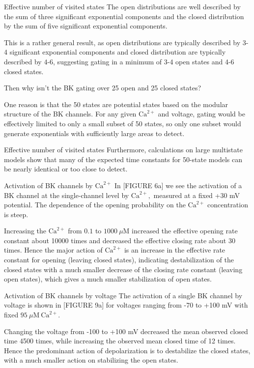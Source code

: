 \documentclass{beamer}
\newcommand{\ca}{\text{Ca}^{2+}}
\begin{document}
\begin{frame}{Effective number of visited states}
The open distributions are well described by the sum of three significant exponential components and the closed distribution by the sum of five significant exponential components.

This is a rather general result, as open distributions are typically described by 3-4 significant exponential components and closed distribution are typically described by 4-6, suggesting gating in a minimum of 3-4 open states and 4-6 closed states.

Then why isn't the BK gating over 25 open and 25 closed states?

One reason is that the 50 states are potential states based on the modular structure of the BK channels. 
For any given $\ca$ and voltage, gating would be effectively limited to only a small subset of 50 states, so only one subset would generate exponentials with sufficiently large areas to detect.

\end{frame}

\begin{frame}{Effective number of visited states}
Furthermore, calculations on large multistate models show that many of the expected time constants for 50-state models can be nearly identical or too close to detect.
\end{frame}

\begin{frame}{Activation of BK channels by $\ca$}
In [FIGURE 6a] we see the activation of a BK channel at the single-channel level by $\ca,$ measured at a fixed +30 mV potential.
The dependence of the opening probability on the $\ca$ concentration is steep.

Increasing the $\ca$ from $0.1$ to $1000\ \mu\text{M}$ increased the effective opening rate constant about 10000 times and decreased the effective closing rate about 30 times.
Hence the major action of $\ca$ is an increase in the effective rate constant for opening (leaving closed states), indicating destabilization of the closed states with a much smaller decrease of the closing rate constant (leaving open states), which gives a much smaller stabilization of open states. 

\end{frame}

\begin{frame}{Activation of BK channels by voltage}
The activation of a single BK channel by voltage is shown in [FIGURE 9a] for voltages ranging from -70 to +100 mV with fixed $95 \ \mu\text{M}\ \ca.$ 

Changing the voltage from -100 to +100 mV decreased the mean observed closed time 4500 times, while increasing the observed mean closed time of 12 times.
Hence the predominant action of depolarization is to destabilize the closed states, with a much smaller action on stabilizing the open states.
\end{frame}
\end{document}
